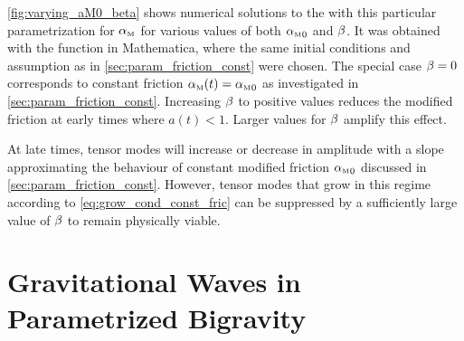 \autoref{fig:varying_aM0_beta} shows numerical solutions to the  with this particular parametrization for \({\alpha_{\textnormal{\tiny{M}}}}\) for various values of both \({\alpha_{\textnormal{\tiny{M}}}}_0\) and \(\beta\). It was obtained with the  function in Mathematica, where the same initial conditions and assumption as in \autoref{sec:param_friction_const} were chosen. The special case \(\beta=0\) corresponds to constant friction \({\alpha_{\textnormal{\tiny{M}}}}(t)={\alpha_{\textnormal{\tiny{M}}}}_0\) as investigated in \autoref{sec:param_friction_const}. Increasing \(\beta\) to positive values reduces the modified friction at early times where \(a(t) < 1\). Larger values for \(\beta\) amplify this effect.


At late times, tensor modes will increase or decrease in amplitude with a slope approximating the behaviour of constant modified friction \({\alpha_{\textnormal{\tiny{M}}}}_0\) discussed in \autoref{sec:param_friction_const}. However, tensor modes that grow in this regime according to \eqref{eq:grow_cond_const_fric} can be suppressed by a sufficiently large value of \(\beta\) to remain physically viable.



\chapter{Gravitational Waves in Parametrized Bigravity}\label{ch:param_bigravity}

